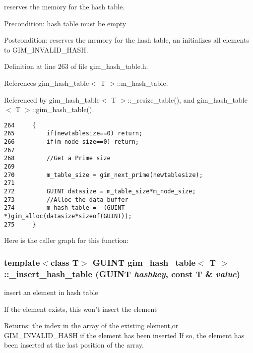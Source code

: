 reserves the memory for the hash table. 

\begin{Desc}
\item[Precondition:]hash table must be empty \end{Desc}
\begin{Desc}
\item[Postcondition:]reserves the memory for the hash table, an initializes all elements to GIM\_\-INVALID\_\-HASH. \end{Desc}


Definition at line 263 of file gim\_\-hash\_\-table.h.

References gim\_\-hash\_\-table$<$ T $>$::m\_\-hash\_\-table.

Referenced by gim\_\-hash\_\-table$<$ T $>$::\_\-resize\_\-table(), and gim\_\-hash\_\-table$<$ T $>$::gim\_\-hash\_\-table().

\begin{Code}\begin{verbatim}264     {
265         if(newtablesize==0) return;
266         if(m_node_size==0) return;
267 
268         //Get a Prime size
269 
270         m_table_size = gim_next_prime(newtablesize);
271 
272         GUINT datasize = m_table_size*m_node_size;
273         //Alloc the data buffer
274         m_hash_table =  (GUINT *)gim_alloc(datasize*sizeof(GUINT));
275     }
\end{verbatim}
\end{Code}




Here is the caller graph for this function:\hypertarget{classgim__hash__table_4339a279d721d1e687b8d8063332bac8}{
\subsubsection[\_\-insert\_\-hash\_\-table]{\setlength{\rightskip}{0pt plus 5cm}template$<$class T$>$ GUINT {\bf gim\_\-hash\_\-table}$<$ T $>$::\_\-insert\_\-hash\_\-table (GUINT {\em hashkey}, \/  const T \& {\em value})}}
\label{classgim__hash__table_4339a279d721d1e687b8d8063332bac8}


insert an element in hash table 

If the element exists, this won't insert the element \begin{Desc}
\item[Returns:]the index in the array of the existing element,or GIM\_\-INVALID\_\-HASH if the element has been inserted If so, the element has been inserted at the last position of the array. \end{Desc}


